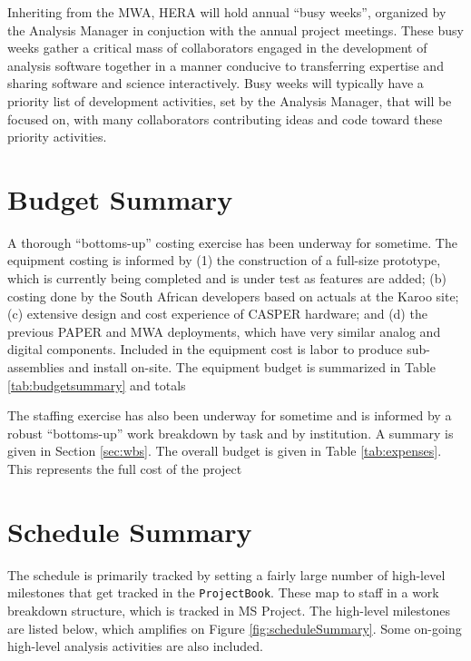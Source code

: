 \documentclass[preprint]{aastex}
\begin{document}
Inheriting from the MWA, HERA will hold annual ``busy weeks'', organized by the Analysis Manager in
conjuction with the annual project meetings.  These busy weeks gather a critical
mass of collaborators engaged in the development of analysis software together in a manner conducive to
transferring expertise and sharing software and science interactively.  Busy weeks will typically
have a priority list of development activities, set by the Analysis Manager, that will be 
focused on, with many collaborators contributing
ideas and code toward these priority activities.



\section{Budget Summary}
\label{sec:budget}
A thorough ``bottoms-up'' costing exercise has been underway for sometime. The
equipment costing is informed by (1) the construction of a full-size prototype, which
is currently being completed and is under test as features are added; (b) costing
done by the South African developers based on actuals at the Karoo site; (c)
extensive design and cost experience of CASPER hardware; and (d) the previous PAPER
and MWA deployments, which have very similar analog and digital components. Included
in the equipment cost is labor to produce sub-assemblies and install on-site. The
equipment budget is summarized in Table \ref{tab:budgetsummary} and totals


The staffing exercise has also been underway for sometime and is informed by a robust
``bottoms-up'' work breakdown by task and by institution. A summary is given in Section \ref{sec:wbs}.
The overall budget is given in Table \ref{tab:expenses}.  This represents the full cost of the project


\section{Schedule Summary}
\label{sec:schedule}
The schedule is primarily tracked by setting a fairly large number of high-level
milestones that get tracked in the {\tt ProjectBook}. These map to staff in a work
breakdown structure, which is tracked in MS Project. The high-level milestones are
listed below, which amplifies on Figure \ref{fig:scheduleSummary}.  Some on-going
high-level analysis activities are also included.
\end{document}
